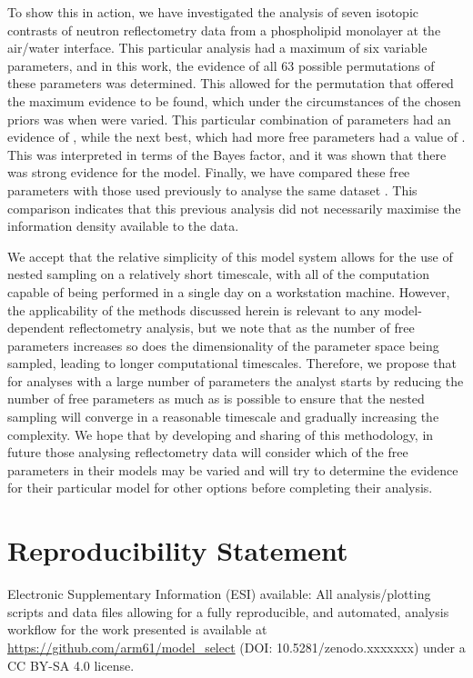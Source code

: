 \documentclass[
 reprint,
 superscriptaddress,
 amsmath,amssymb,
 aps,
]{revtex4-1}
\begin{document}
To show this in action, we have investigated the analysis of seven isotopic contrasts of neutron reflectometry data from a phospholipid monolayer at the air/water interface. 
This particular analysis had a maximum of six variable parameters, and in this work, the evidence of all \num{63} possible permutations of these parameters was determined. 
This allowed for the permutation that offered the maximum evidence to be found, which under the circumstances of the chosen priors was when  were varied. 
This particular combination of parameters had an evidence of , while the next best, which had more free parameters had a value of . 
This was interpreted in terms of the Bayes factor, and it was shown that there was strong evidence for the  model.  
Finally, we have compared these free parameters with those used previously to analyse the same dataset \cite{mccluskey_assessing_2019}. 
This comparison indicates that this previous analysis did not necessarily maximise the information density available to the data. 

We accept that the relative simplicity of this model system allows for the use of nested sampling on a relatively short timescale, with all of the computation capable of being performed in a single day on a workstation machine. 
However, the applicability of the methods discussed herein is relevant to any model-dependent reflectometry analysis, but we note that as the number of free parameters increases so does the dimensionality of the parameter space being sampled, leading to longer computational timescales. 
Therefore, we propose that for analyses with a large number of parameters the analyst starts by reducing the number of free parameters as much as is possible to ensure that the nested sampling will converge in a reasonable timescale and gradually increasing the complexity. 
We hope that by developing and sharing of this methodology, in future those analysing reflectometry data will consider which of the free parameters in their models may be varied and will try to determine the evidence for their particular model for other options before completing their analysis. 

\section*{Reproducibility Statement}

Electronic Supplementary Information (ESI) available: All analysis/plotting scripts and data files allowing for a fully reproducible, and automated, analysis workflow for the work presented is available at \url{https://github.com/arm61/model_select} (DOI: 10.5281/zenodo.xxxxxxx) under a CC BY-SA 4.0 license.
\end{document}

